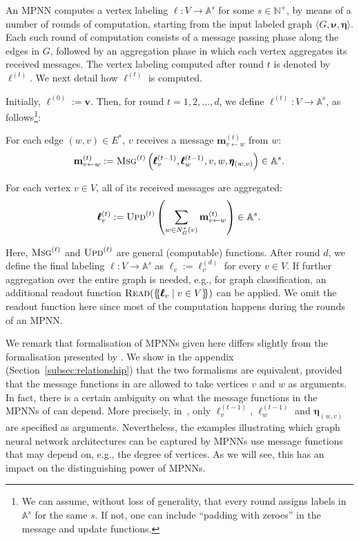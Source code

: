 \documentclass[10pt,a4paper]{article}
\theoremstyle{definition}
\newcommand*{\lmset}{\{\mskip-5mu\{}
\newcommand*{\rmset}{\}\mskip-5mu\}}
\begin{document}
An MPNN computes a vertex labeling $\pmb{\ell}:V\to \mathbb{A}^{s}$ for some $s\in\mathbb{N}^+$, by means of a number of rounds of computation, starting from the input labeled graph $\langle G,\pmb{\nu},\pmb{\eta}\rangle$.
Each such round of computation consists of a message passing phase along the edges in $G$, followed by an aggregation phase in which each vertex aggregates its received messages. The vertex labeling computed after round $t$ is denoted by $\pmb{\ell}^{(t)}$. We next detail how $\pmb{\ell}^{(t)}$ is computed.

Initially, $\pmb{\ell}^{(0)}:=\pmb{v}$. Then, for round $t=1,2,\ldots,d$, we define $\pmb{\ell}^{(t)}:V\to\mathbb{A}^{s}$, as follows\footnote{We can assume, without loss of generality, that every round assigns labels in $\mathbb{A}^s$ for the same $s$. If not, one can include ``padding with zeroes'' in the message and update functions.}:
\begin{description}\setlength{\itemsep}{-0.4ex}
\item  [Message passing.] For each edge $(w,v)\in E^*$, $v$ receives a message $\mathbf{m}_{v\gets w}^{(t)}$ from $w$:
$$
\mathbf{m}^{(t)}_{v\gets w}:=\textsc{Msg}^{(t)}\left(\pmb{\ell}^{(t-1)}_v,\pmb{\ell}^{(t-1)}_w,v,w,\pmb{\eta}_{(w,v)}\right)\in\mathbb{A}^{s}.
$$
\item [Aggregation.] For each vertex $v\in V$, all of its received messages are aggregated:
$$
\pmb{\ell}^{(t)}_v:=\textsc{Upd}^{(t)}\left(\sum_{w\in N_G^*(v)} \mathbf{m}_{v\gets w}^{(t)}\right)\in\mathbb{A}^{s}.
$$
\end{description}
Here, $\textsc{Msg}^{(t)}$ and $\textsc{Upd}^{(t)}$ are general (computable) functions.
After round $d$, we define the final labeling $\pmb{\ell}:V\to\mathbb{A}^{s}$ as  $\pmb{\ell}_v:=\pmb{\ell}^{(d)}_v$ for every $v\in V$. If further aggregation over the entire graph is needed, e.g., for graph classification, an additional readout function 
$\textsc{Read}(\lmset \pmb{\ell}_v\mid v\in V\rmset)$ can be applied. We omit the readout function here since most of the computation happens during the rounds of an MPNN.

We remark that formalisation of MPNNs given here differs slightly from the formalisation presented by \citet{GilmerSRVD17}. We show in the appendix (Section~\ref{subsec:relationship}) that the two formalisms are equivalent, provided that the message functions in \citet{GilmerSRVD17} are allowed to take vertices $v$ and $w$ as arguments. In fact, there is a certain ambiguity on what the message functions in the MPNNs of \citet{GilmerSRVD17} can depend. More precisely, in~\citep{GilmerSRVD17}, only $\pmb{\ell}_v^{(t-1)}$, $\pmb{\ell}_w^{(t-1)}$ and $\pmb{\eta}_{(w,v)}$ are specified as arguments. Nevertheless, the examples illustrating which graph neural network architectures can be captured by MPNNs use message functions that may depend on, e.g., the degree  of vertices. As we will see, this has an impact on the distinguishing power of MPNNs.
\end{document}
